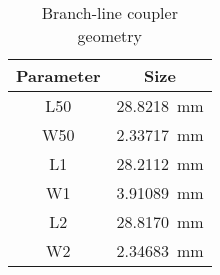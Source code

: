 \begin{table}[h t b p]
\centering
\caption{Branch-line coupler geometry}
\begin{tabular}{|c|c|} \hline
Parameter & Size \\ \hline
L50 & \SI{28.8218}{\milli\meter} \\
W50 & \SI{2.33717}{\milli\meter} \\
L1 & \SI{28.2112}{\milli\meter} \\
W1 & \SI{3.91089}{\milli\meter} \\
L2 & \SI{28.8170}{\milli\meter} \\
W2 & \SI{2.34683}{\milli\meter} \\
\hline
\end{tabular}
\label{tab:msbldc_geometry}
\end{table}